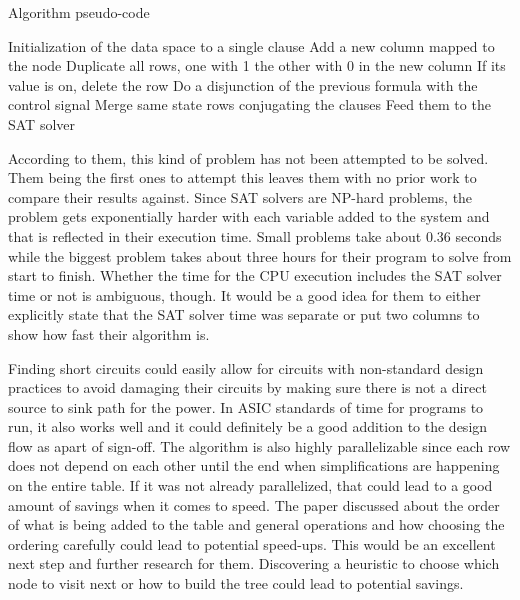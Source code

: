 \documentclass[journal,12pt]{IEEEtran}
\begin{document}
\begin{algorithm}
  \caption{Algorithm pseudo-code~\cite{paper}}\label{lst:pseudo}
  \begin{algorithmic}
    \State Initialization of the data space to a single clause
    \State Add a new column mapped to the node
    \State Duplicate all rows, one with 1 the other
    \State with 0 in the new column
    \EndFor
    \State If its value is on, delete the row
    \Else
    \State Do a disjunction of the previous
    \State formula with the control signal
    \EndIf
    \EndFor
    \State Merge same state rows conjugating the
    \State clauses
    \EndFor
    \EndFor
    \State Feed them to the SAT solver
\end{algorithmic}
\end{algorithm}

According to them, this kind of problem has not been attempted to be
solved. Them being the first ones to attempt this leaves them with no
prior work to compare their results against. Since SAT solvers are
NP-hard problems, the problem gets exponentially harder with each
variable added to the system and that is reflected in their execution
time. Small problems take about 0.36 seconds while the biggest problem
takes about three hours for their program to solve from start to
finish. Whether the time for the CPU execution includes the SAT
solver time or not is ambiguous, though. It would be a good idea for
them to either explicitly state that the SAT solver time was separate
or put two columns to show how fast their algorithm is.

Finding short circuits could easily allow for circuits with
non-standard design practices to avoid damaging their circuits by
making sure there is not a direct source to sink path for the
power. In ASIC standards of time for programs to run, it also works
well and it could definitely be a good addition to the design flow as
apart of sign-off. The algorithm is also highly parallelizable since
each row does not depend on each other until the end when
simplifications are happening on the entire table. If it was not
already parallelized, that could lead to a good amount of savings when
it comes to speed. The paper discussed about the order of what is
being added to the table and general operations and how choosing the
ordering carefully could lead to potential speed-ups. This would be
an excellent next step and further research for them. Discovering a
heuristic to choose which node to visit next or how to build the tree
could lead to potential savings.
\end{document}
